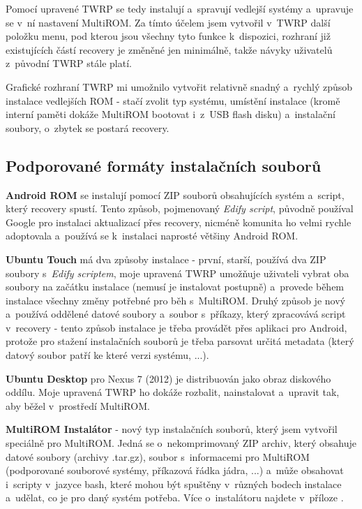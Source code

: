 \documentclass[12pt, a4paper, oneside]{article}
\newcommand{\B}{\textbf} %
\newcommand{\It}{\textit}  %
\begin{document}
Pomocí upravené TWRP se tedy instalují a~spravují vedlejší systémy a~upravuje se v~ní nastavení MultiROM. Za tímto účelem jsem vytvořil v~TWRP další položku menu, pod kterou jsou všechny tyto funkce k~dispozici, rozhraní již existujících částí recovery je změněné jen minimálně, takže návyky uživatelů z~původní TWRP stále platí.

Grafické rozhraní TWRP mi umožnilo vytvořit relativně snadný a~rychlý způsob instalace vedlejších ROM - stačí zvolit typ systému, umístění instalace (kromě interní paměti dokáže MultiROM bootovat i~z~USB flash disku) a~instalační soubory, o~zbytek se postará recovery.

\subsection {Podporované formáty instalačních souborů}
\B{Android ROM} se instalují pomocí ZIP souborů obsahujících systém a~script, který recovery spustí. Tento způsob, pojmenovaný \It{Edify script}, původně používal Google pro instalaci aktualizací přes recovery, nicméně komunita ho velmi rychle adoptovala a~používá se k~instalaci naprosté většiny Android ROM.

\B{Ubuntu Touch} má dva způsoby instalace - první, starší, používá dva ZIP soubory s~\It{Edify scriptem}, moje upravená TWRP umožňuje uživateli vybrat oba soubory na začátku instalace (nemusí je instalovat postupně) a~provede během instalace všechny změny potřebné pro běh s~MultiROM. Druhý způsob je nový a~používá oddělené datové soubory a~soubor s~příkazy, který zpracovává script v~recovery - tento způsob instalace je třeba provádět přes aplikaci pro Android, protože pro stažení instalačních souborů je třeba parsovat určitá metadata (který datový soubor patří ke které verzi systému, ...).

\B{Ubuntu Desktop} pro Nexus 7 (2012) je distribuován jako obraz diskového oddílu. Moje upravená TWRP ho dokáže rozbalit, nainstalovat a~upravit tak, aby běžel v~prostředí MultiROM. 

\B{MultiROM Instalátor} - nový typ instalačních souborů, který jsem vytvořil speciálně pro MultiROM. Jedná se o~nekomprimovaný ZIP archiv, který obsahuje datové soubory (archivy .tar.gz), soubor s~informacemi pro MultiROM (podporované souborové systémy, příkazová řádka jádra, ...) a~může obsahovat i~scripty v~jazyce bash, které mohou být spuštěny v~různých bodech instalace a~udělat, co je pro daný systém potřeba. Více o~instalátoru najdete v~příloze .
\end{document}

